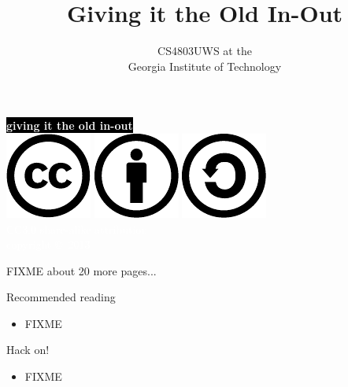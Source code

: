 \documentclass[mathserif,xcolor={dvipsnames,table}]{beamer}
\title{\textbf{Giving it the Old In-Out}}
\date{}
\author{CS4803UWS at the\\
Georgia Institute of Technology
}
\begin{document}
{
%
\begin{frame}[plain]
\textcolor{white}{
%
\colorbox{black}{\textbf{giving it the old in-out}}
}
\vspace{2.7in}
\\
\hfill\includegraphics[scale=.25]{images/cc-logo.pdf}
\includegraphics[scale=.25]{images/cc-new.pdf}
\includegraphics[scale=.25]{images/cc-share.pdf}
\textcolor{white}{
\\
\hfill \tiny{CC3.0 share-alike attribution}\\
}
\textcolor{white}{
\hfill \scriptsize{copyright \copyright\ 2013}\\
}
\end{frame}
}

\begin{frame}
\huge FIXME about 20 more pages...
\end{frame}

\begin{frame}{Recommended reading}
\footnotesize{
\begin{itemize}
\item FIXME
\end{itemize}
}
\end{frame}

\begin{frame}{Hack on!}
\begin{itemize}
\item FIXME
\end{itemize}
\end{frame}
\end{document}
